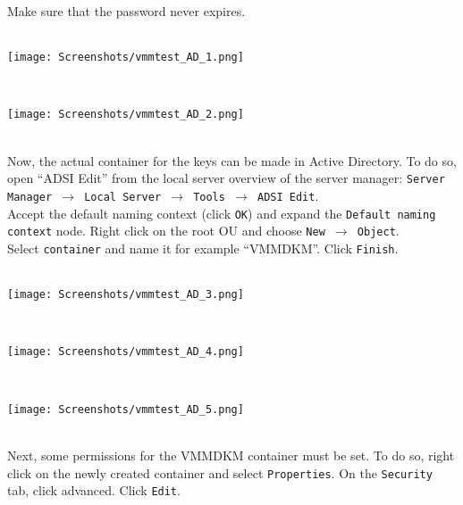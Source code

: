 Make sure that the password never expires.
$\;$ \\ \\
\noindent\begin{minipage}{\textwidth}
    \centering
    \texttt{[image: Screenshots/vmmtest\_AD\_1.png]}
\end{minipage}
$\;$ \\ \\
\noindent\begin{minipage}{\textwidth}
    \centering
    \texttt{[image: Screenshots/vmmtest\_AD\_2.png]}
\end{minipage}
$\;$ \\ \\
Now, the actual container for the keys can be made in Active Directory. To do so, open ``ADSI Edit'' from the local server overview of the server manager: \texttt{Server Manager $\rightarrow$ Local Server $\rightarrow$ Tools $\rightarrow$ ADSI Edit}. \\
Accept the default naming context (click \texttt{OK}) and expand the \texttt{Default naming context} node. Right click on the root OU and choose \texttt{New $\rightarrow$ Object}. \\
Select \texttt{container} and name it for example ``VMMDKM''. Click \texttt{Finish}. 
$\;$ \\ \\
\noindent\begin{minipage}{\textwidth}
    \centering
    \texttt{[image: Screenshots/vmmtest\_AD\_3.png]}
\end{minipage}
$\;$ \\ \\
\noindent\begin{minipage}{\textwidth}
    \centering
    \texttt{[image: Screenshots/vmmtest\_AD\_4.png]}
\end{minipage}
$\;$ \\ \\
\noindent\begin{minipage}{\textwidth}
    \centering
    \texttt{[image: Screenshots/vmmtest\_AD\_5.png]}
\end{minipage}
$\;$ \\ \\
Next, some permissions for the VMMDKM container must be set. To do so, right click on the newly created container and select \texttt{Properties}. On the \texttt{Security} tab, click advanced. Click \texttt{Edit}. \\
